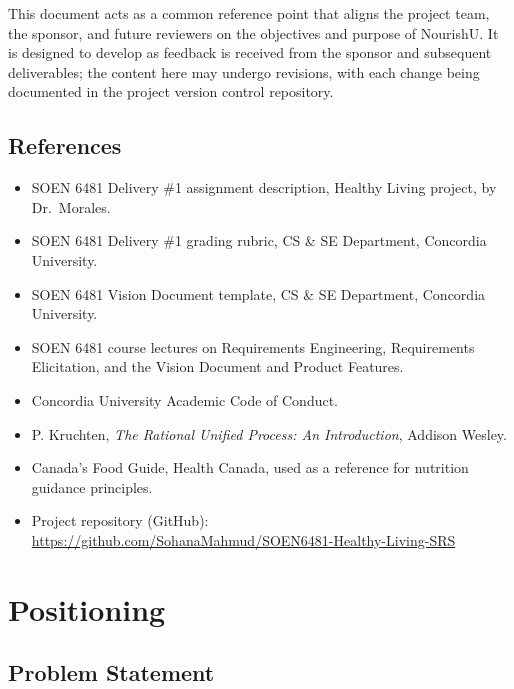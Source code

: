 \documentclass[11pt,a4paper]{article}
\newcommand{\githublink}{https://github.com/SohanaMahmud/SOEN6481-Healthy-Living-SRS}
\begin{document}
This document acts as a common reference point that aligns the project team, the sponsor, and future reviewers on the objectives and purpose of NourishU. It is designed to develop as feedback is received from the sponsor and subsequent deliverables; the content here may undergo revisions, with each change being documented in the project version control repository.

\subsection{References}

\begin{itemize}[leftmargin=1.5em, itemsep=2pt]
    \item SOEN 6481 Delivery \#1 assignment description, Healthy Living project, by Dr.\ Morales.
    \item SOEN 6481 Delivery \#1 grading rubric, CS \& SE Department, Concordia University.
    \item SOEN 6481 Vision Document template, CS \& SE Department, Concordia University.
    \item SOEN 6481 course lectures on Requirements Engineering, Requirements Elicitation, and the Vision Document and Product Features.
    \item Concordia University Academic Code of Conduct.
    \item P. Kruchten, \textit{The Rational Unified Process: An Introduction}, Addison Wesley.
    \item Canada's Food Guide, Health Canada, used as a reference for nutrition guidance principles.
    \item Project repository (GitHub): \url{\githublink}
\end{itemize}

\newpage
\section{Positioning}

\subsection{Problem Statement}
\end{document}
